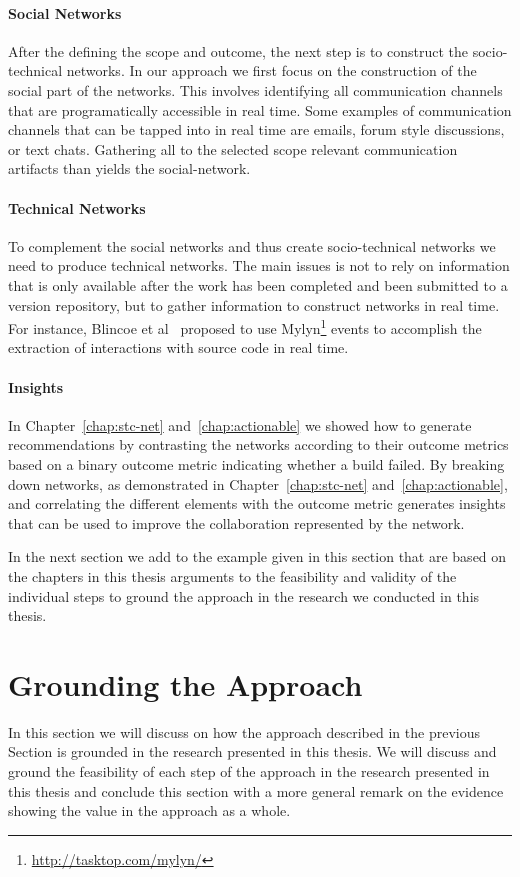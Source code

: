 \paragraph{Social Networks}
After the defining the scope and outcome, the next step is to construct the socio-technical networks.
In our approach we first focus on the construction of the social part of the networks.
This involves identifying all communication channels that are programatically accessible in real time.
Some examples of communication channels that can be tapped into in real time are emails, forum style discussions, or text chats.
Gathering all to the selected scope relevant communication artifacts than yields the social-network.

\paragraph{Technical Networks}
To complement the social networks and thus create socio-technical networks we need to produce technical networks.
The main issues is not to rely on information that is only available after the work has been completed and been submitted to a version repository, but to gather information to construct networks in real time.
For instance, Blincoe et al~\cite{blincoe:cscw:2012} proposed to use Mylyn\footnote{\url{http://tasktop.com/mylyn/}} events to accomplish the extraction of interactions with source code in real time.

\paragraph{Insights}
In Chapter~\ref{chap:stc-net} and~\ref{chap:actionable} we showed how to generate recommendations by contrasting the networks according to their outcome metrics based on a binary outcome metric indicating whether a build failed.
By breaking down networks, as demonstrated in Chapter~\ref{chap:stc-net} and~\ref{chap:actionable}, and correlating the different elements with the outcome metric generates insights that can be used to improve the collaboration represented by the network.

In the next section we add to the example given in this section that are based on the chapters in this thesis arguments to the feasibility and validity of the individual steps to ground the approach in the research we conducted in this thesis.

\section{Grounding the Approach}
In this section we will discuss on how the approach described in the previous Section is grounded in the research presented in this thesis.
We will discuss and ground the feasibility of each step of the approach in the research presented in this thesis and conclude this section with a more general remark on the evidence showing the value in the approach as a whole.

